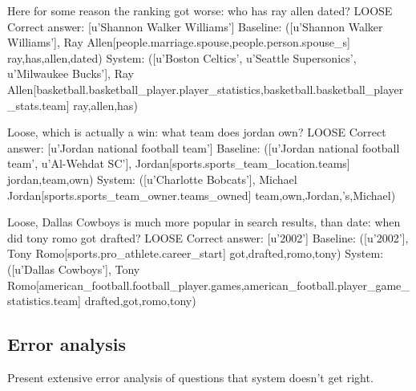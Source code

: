 Here for some reason the ranking got worse:
who has ray allen dated? LOOSE
Correct answer:  [u'Shannon Walker Williams']
Baseline:  ([u'Shannon Walker Williams'], Ray Allen[people.marriage.spouse,people.person.spouse\_s] ray,has,allen,dated)
System:  ([u'Boston Celtics', u'Seattle Supersonics', u'Milwaukee Bucks'], Ray Allen[basketball.basketball\_player.player\_statistics,basketball.basketball\_player\_stats.team] ray,allen,has)


Loose, which is actually a win:
what team does jordan own? LOOSE
Correct answer:  [u'Jordan national football team']
Baseline:  ([u'Jordan national football team', u'Al-Wehdat SC'], Jordan[sports.sports\_team\_location.teams] jordan,team,own)
System:  ([u'Charlotte Bobcats'], Michael Jordan[sports.sports\_team\_owner.teams\_owned] team,own,Jordan,'s,Michael)

Loose, Dallas Cowboys is much more popular in search results, than date:
when did tony romo got drafted? LOOSE
Correct answer:  [u'2002']
Baseline:  ([u'2002'], Tony Romo[sports.pro\_athlete.career\_start] got,drafted,romo,tony)
System:  ([u'Dallas Cowboys'], Tony Romo[american\_football.football\_player.games,american\_football.player\_game\_statistics.team] drafted,got,romo,tony)

\subsection{Error analysis}

Present extensive error analysis of questions that system doesn't get right.
